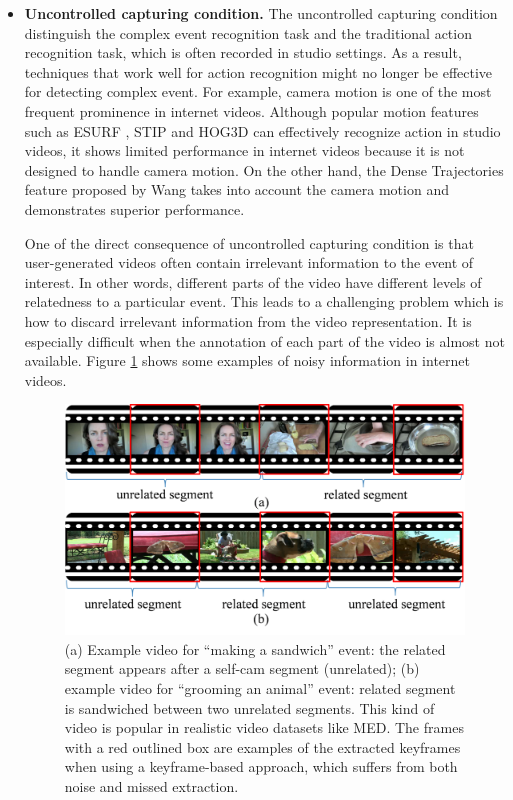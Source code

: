\begin{itemize}
	\item{\textbf{Uncontrolled capturing condition.}} The uncontrolled capturing condition distinguish the complex event recognition task and the traditional action recognition task, which is often recorded in studio settings. As a result, techniques that work well for action recognition might no longer be effective for detecting complex event. For example, camera motion is one of the most frequent prominence in internet videos. Although popular motion features  such as  ESURF \cite{willems2008efficient},  STIP \cite{Laptev03space-timeinterest} and  HOG3D \cite{Klaser08BMVC} can effectively recognize action in studio videos, it shows limited performance in internet videos because it is not designed to handle camera motion. On the other hand, the Dense Trajectories feature proposed by Wang \cite{wang2013action} takes into account the camera motion and demonstrates superior performance.
	 
	One of the direct consequence of uncontrolled capturing condition is that user-generated videos often contain irrelevant information to the event of interest. In other words, different parts of the video have different levels of relatedness to a particular event. This leads to a challenging problem which is how to discard irrelevant information from the video representation. It is especially difficult when the annotation of each part of the video is almost not available. Figure \ref{c1_uncontrolled} shows some examples of noisy information in internet videos.
	
	\begin{figure}
		\centering
		\includegraphics[width=1\textwidth]{teaser_image.png}
		\caption{(a) Example video for ``making a sandwich'' event: the related segment appears after a self-cam segment (unrelated); (b) example video for ``grooming an animal'' event: related segment is sandwiched between two unrelated segments. This kind of video is popular in realistic video datasets like MED. The frames with a red outlined box are examples of the extracted keyframes when using a keyframe-based approach, which suffers from both noise and missed extraction.}
		\label{c1_uncontrolled}
	\end{figure}
	 

\end{itemize}
